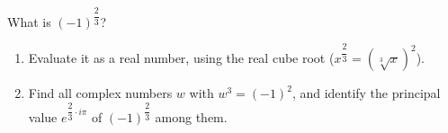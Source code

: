 What is $(-1)^{\dfrac{2}{3}}$?
\begin{enumerate}
\item[(a)] Evaluate it as a real number, using the real cube root ($x^{\dfrac{2}{3}}=\left(\sqrt[3]{x}\right)^2$).
\item[(b)] Find all complex numbers $w$ with $w^3=(-1)^2$, and identify the principal value $e^{\dfrac{2}{3}\cdot i\pi}$ of $(-1)^{\dfrac23}$ among them.
\end{enumerate}

